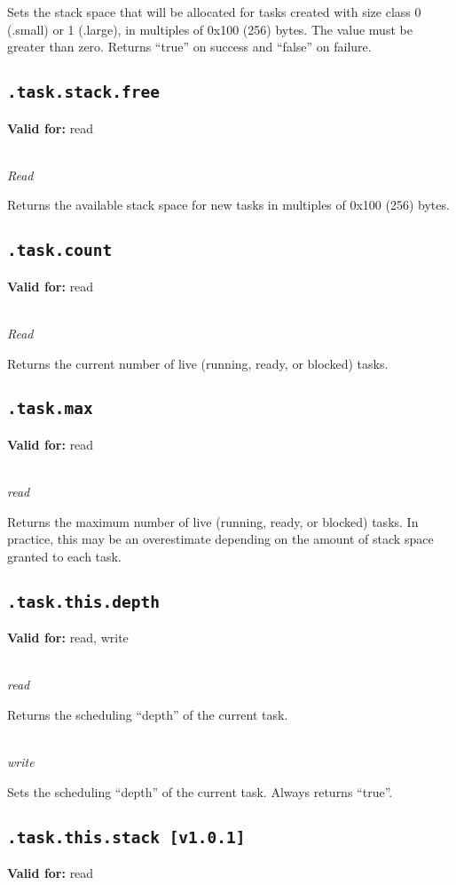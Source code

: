 \documentclass{article}
\begin{document}
Sets the stack space that will be allocated for tasks created with size class 0 (.small) or 1 (.large), in multiples of 0x100 (256) bytes. The value must be greater than zero.
Returns ``true'' on success and ``false'' on failure.

\subsection{\texttt{.task.stack.free}}
\textbf{Valid for:} read

~\\
\textit{Read}

Returns the available stack space for new tasks in multiples of 0x100 (256) bytes.

\subsection{\texttt{.task.count}}
\textbf{Valid for:} read

~\\
\textit{Read}

Returns the current number of live (running, ready, or blocked) tasks.

\subsection{\texttt{.task.max}}
\textbf{Valid for:} read

~\\
\textit{read}

Returns the maximum number of live (running, ready, or blocked) tasks. In practice, this may be an overestimate depending on the amount of stack space granted to each task.

\subsection{\texttt{.task.this.depth}}
\textbf{Valid for:} read, write

~\\
\textit{read}

Returns the scheduling ``depth'' of the current task.

~\\
\textit{write}

Sets the scheduling ``depth'' of the current task. Always returns ``true''.

\subsection{\texttt{.task.this.stack [v1.0.1]}}
\textbf{Valid for:} read
\end{document}
